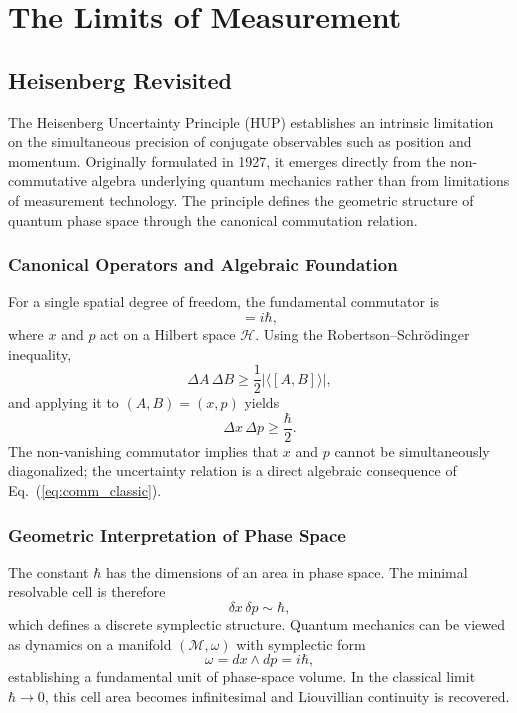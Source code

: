 \documentclass[11pt,oneside]{book}
\numberwithin{equation}{chapter}
\begin{document}
\chapter{The Limits of Measurement}
\section{Heisenberg Revisited}
The Heisenberg Uncertainty Principle (HUP) establishes an intrinsic limitation on the simultaneous precision of conjugate observables such as position and momentum. Originally formulated in 1927, it emerges directly from the non-commutative algebra underlying quantum mechanics rather than from limitations of measurement technology. The principle defines the geometric structure of quantum phase space through the canonical commutation relation.

\subsection*{Canonical Operators and Algebraic Foundation}

For a single spatial degree of freedom, the fundamental commutator is
\begin{equation}
[x,p]=i\hbar,
\label{eq:comm_classic}
\end{equation}
where $x$ and $p$ act on a Hilbert space $\mathcal{H}$.  
Using the Robertson–Schrödinger inequality,
\begin{equation}
\Delta A\,\Delta B \ge \frac{1}{2}\big|\langle[A,B]\rangle\big|,
\label{eq:RS}
\end{equation}
and applying it to $(A,B)=(x,p)$ yields
\begin{equation}
\Delta x\,\Delta p \ge \frac{\hbar}{2}.
\label{eq:HUP}
\end{equation}
The non-vanishing commutator implies that $x$ and $p$ cannot be simultaneously diagonalized; the uncertainty relation is a direct algebraic consequence of Eq.~(\ref{eq:comm_classic}).

\subsection*{Geometric Interpretation of Phase Space}

The constant $\hbar$ has the dimensions of an area in phase space.  
The minimal resolvable cell is therefore
\begin{equation}
\delta x\,\delta p \sim \hbar,
\label{eq:pscell}
\end{equation}
which defines a discrete symplectic structure.  
Quantum mechanics can be viewed as dynamics on a manifold $(\mathcal{M},\omega)$ with symplectic form
\begin{equation}
\omega = dx \wedge dp = i\hbar,
\end{equation}
establishing a fundamental unit of phase-space volume.  
In the classical limit $\hbar\!\to\!0$, this cell area becomes infinitesimal and Liouvillian continuity is recovered.
\end{document}
